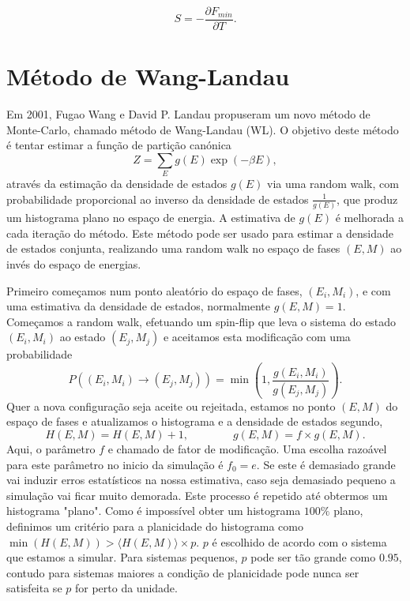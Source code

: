 \documentclass[12pt, a4paper]{article}
\begin{document}
\begin{equation}
	S = - \frac{\partial F_{min}}{\partial T}.
\end{equation}

\pagebreak
	
	\section{Método de Wang-Landau}
	
	Em 2001, Fugao Wang e David P. Landau propuseram um novo método de Monte-Carlo, chamado método de Wang-Landau (WL). O objetivo deste método é tentar estimar a função de partição canónica 
\begin{equation}
	Z = \sum_E g(E) \exp(-\beta E),
\end{equation}
através da estimação da densidade de estados $g(E)$ via uma random walk, com probabilidade proporcional ao inverso da densidade de estados $\frac{1}{g(E)}$, que produz um histograma plano no espaço de energia. A estimativa de $g(E)$ é melhorada a cada iteração do método.
Este método pode ser usado para estimar a densidade de estados conjunta, realizando uma random walk no espaço de fases $(E, M)$ ao invés do espaço de energias. 

Primeiro começamos num ponto aleatório do espaço de fases, $(E_i, M_i)$,  e com uma estimativa da densidade de estados, normalmente $g(E, M)=1$. Começamos a random walk, efetuando um spin-flip que leva o sistema do estado $(E_i, M_i)$ ao estado $(E_j, M_j)$ e aceitamos esta modificação com uma probabilidade
\begin{equation}
	P((E_i, M_i) \rightarrow (E_j, M_j)) = \min\left(1, \frac{g(E_i, M_i)}{g(E_j, M_j)}\right).
\end{equation}
Quer a nova configuração seja aceite ou rejeitada, estamos no ponto $(E, M)$ do espaço de fases e atualizamos o histograma e a densidade de estados segundo,
\begin{equation*}
	H(E, M) = H(E,M)+1, \quad \quad \quad \quad g(E,M)=f \times g(E,M).
\end{equation*}
Aqui, o parâmetro $f$ e chamado de fator de modificação. Uma escolha razoável para este parâmetro no inicio da simulação é $f_0=e$. Se este é demasiado grande vai induzir erros estatísticos na nossa estimativa, caso seja demasiado pequeno a simulação vai ficar muito demorada. 
Este processo é repetido até obtermos um histograma "plano". Como é impossível obter um histograma $100\%$ plano, definimos um critério para a planicidade do histograma como $\min(H(E, M)) > \langle H(E, M) \rangle \times p$. $p$ é escolhido de acordo com o sistema que estamos a simular. Para sistemas pequenos, $p$ pode ser tão grande como $0.95$, contudo para sistemas maiores a condição de planicidade pode nunca ser satisfeita se $p$ for perto da unidade.
\end{document}
